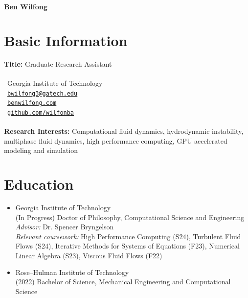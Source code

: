 \documentclass{article}
\begin{document}
\begin{center}
    \LARGE{\textbf{Ben Wilfong}}
\end{center}

\section{Basic Information}
\textbf{Title:} Graduate Research Assistant \\~\\
\faBuilding\ Georgia Institute of Technology \\
\faEnvelopeSquare\ \href{mailto:bwilfong3@gatech.edu}{\texttt{bwilfong3@gatech.edu}} \\
\faArrowAltCircleRight\  \href{https://benwilfong.com}{\texttt{benwilfong.com}} \\
\faGithub\ \href{https://github.com/wilfonba}{\texttt{github.com/wilfonba}} \\~\\
\textbf{Research Interests:} Computational fluid dynamics, hydrodynamic instability, multiphase fluid dynamics, high performance computing, GPU accelerated modeling and simulation

\section{Education}
\begin{itemize}
    \item[\faGraduationCap] Georgia Institute of Technology \\
    \hspace*{0.25cm} (In Progress) Doctor of Philosophy, Computational Science and Engineering \\
    \hspace*{2.4cm} \textit{Advisor:} Dr. Spencer Bryngelson \\
    \hspace*{2.4cm} \textit{Relevant coursework:} High Performance Computing (S24), Turbulent Fluid 
    \hspace*{2.4cm} Flows (S24), Iterative Methods for Systems of Equations (F23), Numerical 
    \hspace*{2.4cm} Linear Algebra (S23), Viscous Fluid Flows (F22) \\
    \item[\faGraduationCap] Rose--Hulman Institute of Technology \\
    \hspace*{0.25cm} (2022) Bachelor of Science, Mechanical Engineering and Computational Science
\end{itemize}
\end{document}
